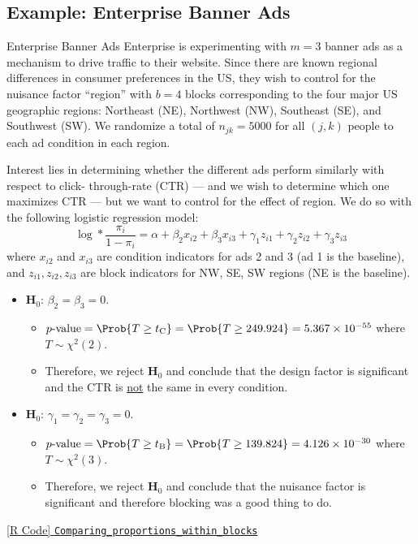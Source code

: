 \subsection{Example: Enterprise Banner Ads}
\begin{Example}{Enterprise Banner Ads}{}
    Enterprise is experimenting with $m = 3$ banner ads as a mechanism to drive traffic to their website. Since
    there are known regional differences in consumer preferences in the US, they wish to control for the nuisance
    factor ``region'' with $b = 4$ blocks corresponding to the four major US geographic regions: Northeast (NE),
    Northwest (NW), Southeast (SE), and Southwest (SW). We randomize a total of $n_{jk} = 5000$ for all $ (j,k) $ people
    to each ad condition in each region.

    \vspace{2mm}

    Interest lies in determining whether the different ads perform similarly with respect to click-
    through-rate (CTR) --- and we wish to determine which one maximizes CTR --- but we want to control for
    the effect of region. We do so with the following logistic regression model:
    \[ \log*{\frac{\pi_i}{1-\pi_i}}=\alpha+\beta_2 x_{i2}+\beta_3 x_{i3}+\gamma_1 z_{i1}+\gamma_2 z_{i2}+\gamma_3 z_{i3} \]
    where $ x_{i2} $ and $ x_{i3} $ are condition indicators for ads 2 and 3 (ad 1 is the baseline),
    and $ z_{i1},z_{i2},z_{i3} $ are block indicators for NW, SE, SW regions (NE is the baseline).
    \begin{itemize}
        \item $ \mathbf{H}_0 $: $ \beta_2=\beta_3=0 $.
              \begin{itemize}
                  \item $ p\text{-value}=\Prob{T\ge t_\text{C}}=\Prob{T\ge 249.924}=5.367\times 10^{-55} $ where $ T \sim \chi^2(2) $.
                  \item Therefore, we reject $ \mathbf{H}_0 $ and conclude that the design factor is significant and the CTR is \underline{not}
                        the same in every condition.
              \end{itemize}
        \item $ \mathbf{H}_0 $: $ \gamma_1=\gamma_2=\gamma_3=0 $.
              \begin{itemize}
                  \item $ p\text{-value}=\Prob{T\ge t_\text{B}}=\Prob{T\ge 139.824}=4.126\times 10^{-30} $ where $ T \sim \chi^2(3) $.
                  \item Therefore, we reject $ \mathbf{H}_0 $ and conclude that the nuisance factor is significant
                        and therefore blocking was a good thing to do.
              \end{itemize}
    \end{itemize}
    \href{https://github.com/Hextical/university-notes/blob/master/year-3/semester-3/STAT 430/code/W5/Comparing_proportions_within_blocks.R}{[R Code] \texttt{Comparing\_proportions\_within\_blocks}}
\end{Example}
